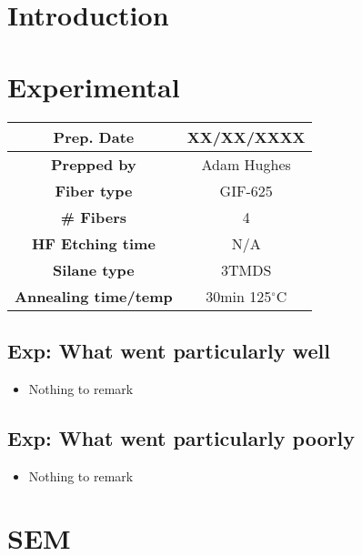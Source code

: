 \section{Introduction}

\section{Experimental}


\begin{center}
\begin{tabular}{| c | c |}
 \hline
 {\bf Prep. Date} & XX/XX/XXXX \\ \hline
 {\bf Prepped by} & Adam Hughes \\ \hline

 {\bf Fiber type} & GIF-625 \\ \hline
 {\bf \# Fibers} & 4  \\ \hline
 {\bf HF Etching time} & N/A \\ \hline
 {\bf Silane type} & 3TMDS \\ \hline
 {\bf Annealing time/temp} & 30min 125$^\circ$C  \\ \hline
\end{tabular}
\end{center}

\vspace{.3cm}


\subsection{Exp: {\color{blue} What went particularly well}}

\begin{itemize}
\item{Nothing to remark}
\end{itemize}

\subsection{Exp: {\color{red} What went particularly poorly}}

\begin{itemize}
\item{Nothing to remark}
\end{itemize}

\section{SEM}

